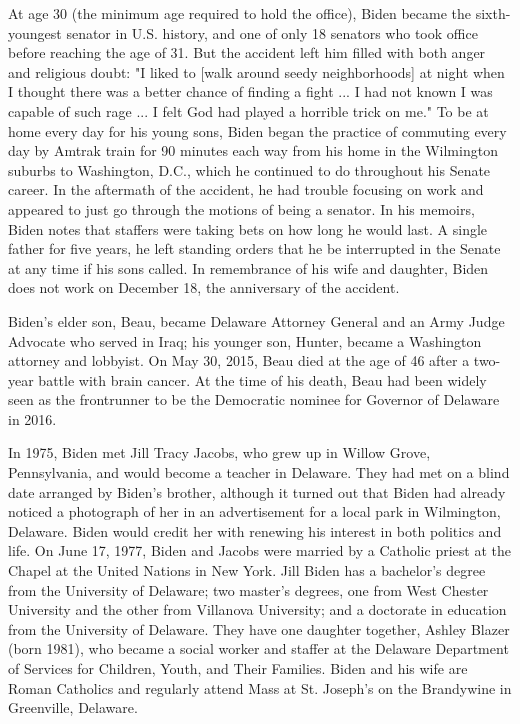 At age 30 (the minimum age required to hold the office), Biden became
the sixth-youngest senator in U.S. history, and one of only 18 senators
who took office before reaching the age of 31. But the accident left him
filled with both anger and religious doubt: "I liked to {[}walk around
seedy neighborhoods{]} at night when I thought there was a better chance
of finding a fight ... I had not known I was capable of such rage ... I
felt God had played a horrible trick on me." To be at home every day for
his young sons, Biden began the practice of commuting every day by
Amtrak train for 90 minutes each way from his home in the Wilmington
suburbs to Washington, D.C., which he continued to do throughout his
Senate career. In the aftermath of the accident, he had trouble focusing
on work and appeared to just go through the motions of being a senator.
In his memoirs, Biden notes that staffers were taking bets on how long
he would last. A single father for five years, he left standing orders
that he be interrupted in the Senate at any time if his sons called. In
remembrance of his wife and daughter, Biden does not work on December
18, the anniversary of the accident.

Biden's elder son, Beau, became Delaware Attorney General and an Army
Judge Advocate who served in Iraq; his younger son, Hunter, became a
Washington attorney and lobbyist. On May 30, 2015, Beau died at the age
of 46 after a two-year battle with brain cancer. At the time of his
death, Beau had been widely seen as the frontrunner to be the Democratic
nominee for Governor of Delaware in 2016.

In 1975, Biden met Jill Tracy Jacobs, who grew up in Willow Grove,
Pennsylvania, and would become a teacher in Delaware. They had met on a
blind date arranged by Biden's brother, although it turned out that
Biden had already noticed a photograph of her in an advertisement for a
local park in Wilmington, Delaware. Biden would credit her with renewing
his interest in both politics and life. On June 17, 1977, Biden and
Jacobs were married by a Catholic priest at the Chapel at the United
Nations in New York. Jill Biden has a bachelor's degree from the
University of Delaware; two master's degrees, one from West Chester
University and the other from Villanova University; and a doctorate in
education from the University of Delaware. They have one daughter
together, Ashley Blazer (born 1981), who became a social worker and
staffer at the Delaware Department of Services for Children, Youth, and
Their Families. Biden and his wife are Roman Catholics and regularly
attend Mass at St. Joseph's on the Brandywine in Greenville, Delaware.


